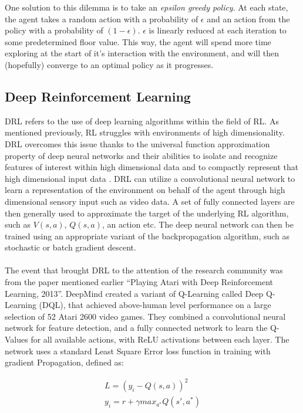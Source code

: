 One solution to this dilemma is to take an \textit{epsilon greedy policy}. At each state, the agent
takes a random action with a probability of $\epsilon$ and an action from the policy with a
probability of $(1-\epsilon)$. $\epsilon$ is linearly reduced at each iteration to some
predetermined floor value. This way, the agent will spend more time exploring at the start of it's
interaction with the environment, and will then (hopefully) converge to an optimal policy as it progresses.

\subsection{Deep Reinforcement Learning}
DRL refers to the use of deep learning algorithms within the field of RL. As mentioned previously, RL struggles with environments of high dimensionality. DRL overcomes this issue thanks to the universal function approximation property of deep neural networks and their abilities to isolate and recognize features of interest within high dimensional data and to compactly represent that high dimensional input data \cite{survey-drl}. DRL can utilize a convolutional neural network to learn a representation of the environment on behalf of the agent through high dimensional sensory input such as video data. A set of fully connected layers are then generally used to approximate the target of the underlying RL algorithm, such as $V(s, a)$, $Q(s, a)$, an action etc. The deep neural network can then be trained using an appropriate variant of the backpropagation algorithm, such as stochastic or batch gradient descent. \paragraph{}

The event that brought DRL to the attention of the research community was from the paper mentioned earlier ``Playing Atari with Deep Reinforcement Learning, 2013''. DeepMind created a variant of Q-Learning called Deep Q-Learning (DQL), that achieved above-human level performance on a large selection of 52 Atari 2600 video games. They combined a convolutional neural network for feature detection, and a fully connected network to learn the Q-Values for all available actions, with ReLU activations between each layer. The network uses a standard Least Square Error loss function in training with gradient Propagation, defined as:

\begin{align*}
    L = (y_i - Q(s, a))^2 \\
    y_i = r + \gamma max_{a^*}Q(s', a^*)
\end{align*}

